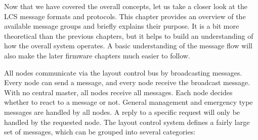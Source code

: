 
Now that we have covered the overall concepts, let us take a closer look at the LCS message formats and protocols. This chapter provides an overview of the available message groups and briefly explains their purpose. It is a bit more theoretical than the previous chapters, but it helps to build an understanding of how the overall system operates. A basic understanding of the message flow will also make the later firmware chapters much easier to follow.

\begin{center}
\end{center}

All nodes communicate via the layout control bus by broadcasting messages. Every node can send a message, and every node receive  the broadcast message. With no central master, all nodes receive all messages. Each node decides whether to react to a message or not. General management and emergency type messages are handled by all nodes. A reply to a specific request will only be handled by the requested node. The layout control system defines a fairly large set of messages, which can be grouped into several categories:

